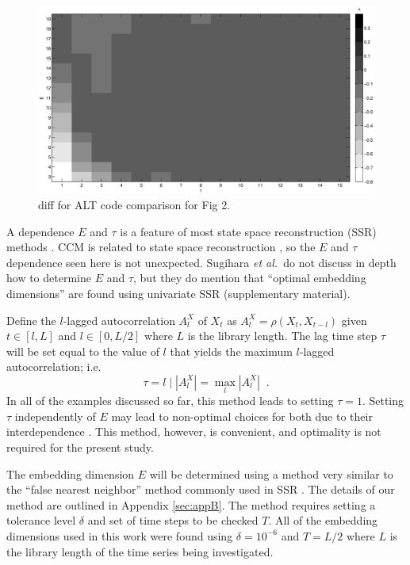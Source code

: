 \documentclass[a4paper,11pt]{article}
\begin{document}
\begin{figure}[ht]
\label{fig:}
\includegraphics[scale=0.4]{Figure2_diff.eps}
\caption{diff for ALT code comparison for Fig 2.}
\end{figure}
\newpage

A dependence $E$ and $\tau$ is a feature of most state space reconstruction (SSR) methods \cite{Hong2006,vlachos2009,Small2004}.  CCM is related to state space reconstruction \cite{Sugihara2012}, so the $E$ and $\tau$ dependence seen here is not unexpected.  Sugihara {\em et al.\ }do not discuss in depth how to determine $E$ and $\tau$, but they do mention that ``optimal embedding dimensions'' are found using univariate SSR \cite{Sugihara2012} (supplementary material).  

Define the $l$-lagged autocorrelation $A_l^X$ of $X_t$ as $A_l^X=\rho\left(X_t,X_{t-l}\right)$ given $t\in[l,L]$ and $l\in[0,L/2]$ where $L$ is the library length.  The lag time step $\tau$ will be set equal to the value of $l$ that yields the maximum $l$-lagged autocorrelation; i.e.\
\begin{equation}
\tau = l \;|\; \left|A_l^X\right| = \max_l \left|A_l^X\right|\;\;.
\end{equation}
In all of the examples discussed so far, this method leads to setting $\tau=1$.  Setting $\tau$ independently of $E$ may lead to non-optimal choices for both due to their interdependence \cite{Small2004}.  This method, however, is convenient, and optimality is not required for the present study.

The embedding dimension $E$ will be determined using a method very similar to the ``false nearest neighbor'' method commonly used in SSR \cite{Kennel1992}.  The details of our method are outlined in Appendix \ref{sec:appB}.  The method requires setting a tolerance level $\delta$ and set of time steps to be checked $T$.  All of the embedding dimensions used in this work were found using $\delta=10^{-6}$ and $T=L/2$ where $L$ is the library length of the time series being investigated.
\end{document}
